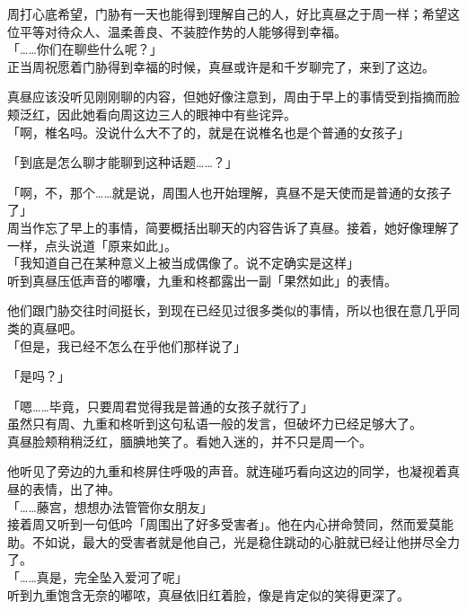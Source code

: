 周打心底希望，门胁有一天也能得到理解自己的人，好比真昼之于周一样；希望这位平等对待众人、温柔善良、不装腔作势的人能够得到幸福。\\

「……你们在聊些什么呢？」\\

正当周祝愿着门胁得到幸福的时候，真昼或许是和千岁聊完了，来到了这边。

真昼应该没听见刚刚聊的内容，但她好像注意到，周由于早上的事情受到指摘而脸颊泛红，因此她看向周这边三人的眼神中有些诧异。\\

「啊，椎名吗。没说什么大不了的，就是在说椎名也是个普通的女孩子」

「到底是怎么聊才能聊到这种话题……？」

「啊，不，那个……就是说，周围人也开始理解，真昼不是天使而是普通的女孩子了」\\

周当作忘了早上的事情，简要概括出聊天的内容告诉了真昼。接着，她好像理解了一样，点头说道「原来如此」。\\

「我知道自己在某种意义上被当成偶像了。说不定确实是这样」\\

听到真昼压低声音的嘟囔，九重和柊都露出一副「果然如此」的表情。

他们跟门胁交往时间挺长，到现在已经见过很多类似的事情，所以也很在意几乎同类的真昼吧。\\

「但是，我已经不怎么在乎他们那样说了」

「是吗？」

「嗯……毕竟，只要周君觉得我是普通的女孩子就行了」\\

虽然只有周、九重和柊听到这句私语一般的发言，但破坏力已经足够大了。\\

真昼脸颊稍稍泛红，腼腆地笑了。看她入迷的，并不只是周一个。

他听见了旁边的九重和柊屏住呼吸的声音。就连碰巧看向这边的同学，也凝视着真昼的表情，出了神。\\

「……藤宫，想想办法管管你女朋友」\\

接着周又听到一句低吟「周围出了好多受害者」。他在内心拼命赞同，然而爱莫能助。不如说，最大的受害者就是他自己，光是稳住跳动的心脏就已经让他拼尽全力了。\\

「……真是，完全坠入爱河了呢」\\

听到九重饱含无奈的嘟哝，真昼依旧红着脸，像是肯定似的笑得更深了。
